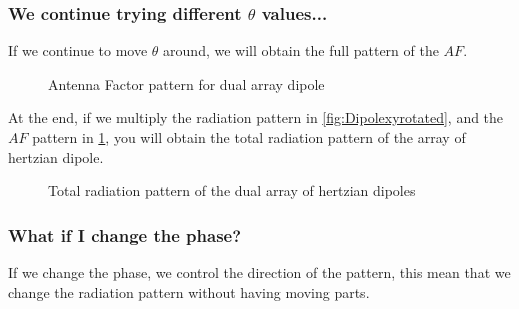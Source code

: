 \subsubsection*{We continue trying different $\theta$ values...}
If we continue to move $\theta$ around, we will obtain the full pattern of the $AF$.
\begin{figure}[H]
    \begin{center}
        \caption{Antenna Factor pattern for dual array dipole}\label{fig:AFhertzian}
    \end{center}
\end{figure}
At the end, if we multiply the radiation pattern in \cref{fig:Dipolexyrotated}, and the $AF$ pattern in \cref{fig:AFhertzian}, you will obtain the total radiation pattern of the array of hertzian dipole.
\begin{figure}[H]
    \begin{center}
        \caption{Total radiation pattern of the dual array of hertzian dipoles}\label{fig:tot_radiation_array}
    \end{center}
\end{figure}
\subsubsection*{What if I change the phase?}
If we change the phase, we control the direction of the pattern, this mean that we change the radiation pattern without having moving parts.
